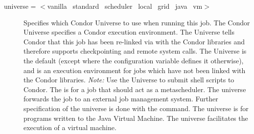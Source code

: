 \begin{description}

\item[universe = $<$vanilla \Bar\ standard \Bar\ scheduler
\Bar\ local \Bar\ grid \Bar\ java \Bar\ vm$>$]
\label{man-condor-submit-universe}
Specifies which Condor Universe to use when running this job.  The Condor
Universe specifies a Condor execution environment.
The  Universe tells Condor that this job has been
re-linked via  with the Condor libraries and therefore
supports checkpointing and remote system calls.
The  Universe is the default (except where the
configuration variable  defines it
otherwise), and is an execution environment for jobs which have not
been linked with the Condor libraries.  \emph{Note:} Use the
 Universe to submit shell scripts to Condor.
The  is for a job that
should act as a metascheduler.
The  universe forwards the job to an external job
management system.
Further specification of the  universe is done with the
 command.
The  universe is for programs written to the Java Virtual Machine.
The  universe facilitates the execution of a virtual
machine.

\end{description} 


